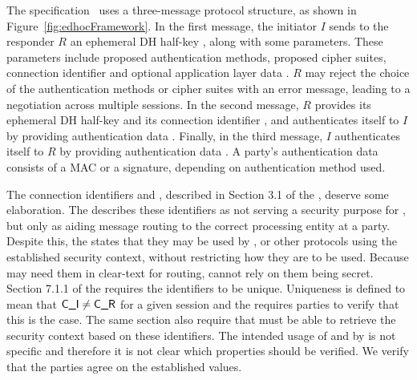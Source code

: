 
%
The \mEdhoc{} specification~\cite{our-analysis-selander-lake-edhoc-00} uses
a three-message protocol structure, as
shown in Figure~\ref{fig:edhocFramework}.
%
%
In the first message, the initiator $I$ sends to the responder $R$ an
ephemeral DH half-key \mGx{}, along with some parameters.
%
These parameters include proposed \mEdhoc{} authentication methods, proposed
cipher suites, connection identifier \mCi{} and optional application layer data
\mADone.
%
$R$ may reject the choice of the authentication methods
or cipher suites with an error message, leading to a negotiation across
multiple \mEdhoc{} sessions.
%
In the second message, $R$ provides its ephemeral
DH half-key \mGy{} and its connection identifier \mCr, and authenticates itself
to $I$ by providing authentication data \mAuthr{}.
%
Finally, in the third message, $I$ authenticates itself
to $R$ by providing authentication data \mAuthi{}.
%
A party's authentication data consists of a MAC or a signature, depending on
authentication method used.
%

The connection identifiers \mCi{} and \mCr{}, described in Section 3.1 of the
\mSpec{}, deserve some elaboration.
%
The \mSpec{} describes these identifiers as not serving a security purpose for
\mEdhoc{}, but only as aiding message routing to the correct \mEdhoc{} processing
entity at a party.
%
Despite this, the \mSpec{} states that they may be used by \mOscore{}, or other
protocols using the established security context, without restricting how they
are to be used.
%
Because \mEdhoc{} may need them in clear-text for routing, \mOscore{} cannot
rely on them being secret.
%
Section 7.1.1 of the \mSpec{} requires the identifiers to be unique.
%
Uniqueness is defined to mean that $\textsf{C\_I}{} \not = \textsf{C\_R}{}$ for a given session
and the \mSpec{} requires parties to verify that this is the case.
%
The same section also require that \mOscore{} must be able to retrieve the
security context based on these identifiers.
%
The intended usage of \mCi{} and \mCr{} by \mOscore{} is not specific and
therefore it is not clear which properties should be verified.
%
We verify that the parties agree on the established values.
%

